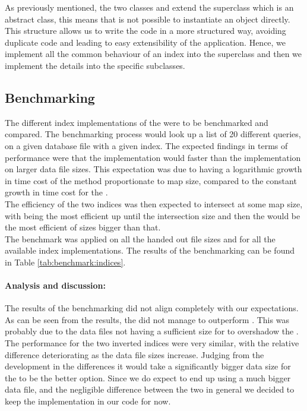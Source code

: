 As previously mentioned, the two classes  and  extend the superclass  which is an abstract class, this means that is not possible to instantiate an  object directly. This structure allows us to write the code in a more structured way, avoiding duplicate code and leading to easy extensibility of the application. Hence, we implement all the common behaviour of an index into the  superclass and then we implement the details into the specific subclasses.

\subsection{Benchmarking}
The different index implementations of the were to be benchmarked and compared. 
The benchmarking process would look up a list of 20 different queries, on a given database file with a given index. The expected findings in terms of performance were that the  implementation would faster than the  implementation on larger data file sizes. This expectation was due to  having a logarithmic growth in time cost of the  method proportionate to map size, compared to the constant growth in time cost for the . \\
The efficiency of the two indices was then expected to intersect at some map size, with  being the most efficient up until the intersection size and then the  would be the most efficient of sizes bigger than that. \\
The benchmark was applied on all the handed out file sizes and for all the available index implementations. The results of the benchmarking can be found in Table \ref{tab:benchmark:indices}.

\paragraph{Analysis and discussion:}
The results of the benchmarking did not align completely with our expectations. As can be seen from the results, the  did not manage to outperform . This was probably due to the data files not having a sufficient size for  to overshadow the . The performance for the two inverted indices were very similar, with the relative difference deteriorating as the data file sizes increase. Judging from the development in the differences it would take a significantly bigger data size for the  to be the better option. Since we do expect to end up using a much bigger data file, and the negligible difference between the two in general we decided to keep the  implementation in our code for now.

